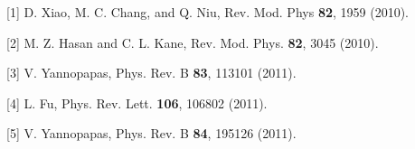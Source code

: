{\normalsize
[1] D. Xiao, M. C. Chang, and Q. Niu, Rev. Mod. Phys \textbf{82}, 1959 (2010).
\vsp

[2] M. Z. Hasan and C. L. Kane, Rev. Mod. Phys. \textbf{82}, 3045 (2010).
\vsp

[3] V. Yannopapas, Phys. Rev. B \textbf{83}, 113101 (2011).
\vsp

[4] L. Fu, Phys. Rev. Lett. \textbf{106}, 106802 (2011).
\vsp

[5] V. Yannopapas, Phys. Rev. B \textbf{84}, 195126 (2011).
}

\vspace{\baselineskip} 